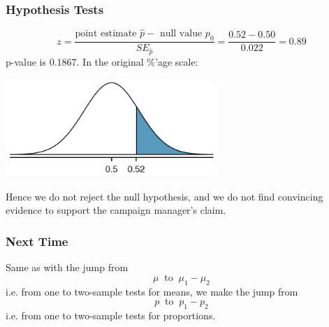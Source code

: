 \documentclass[handout]{beamer}
\newcommand{\blue}[1]{\textcolor{blue2}{#1}}
\newcommand{\phat}{\widehat{p}}
\begin{document}
\begin{frame}[fragile]
\frametitle{Hypothesis Tests}

%
%
\[
z = \frac{\mbox{point estimate }\phat - \mbox{ null value }p_0}{SE_{\phat}} = \frac{0.52 - 0.50}{0.022} = 0.89
\]
\pause p-value is 0.1867.  In the original \%'age scale:
\begin{center}
   \includegraphics[width=0.6\textwidth]{figure/pvalue.png} 
\end{center}
\pause Hence we do \blue{not} reject the null hypothesis, and we do not find convincing evidence to support the campaign manager's claim.  

\end{frame}


\begin{frame}[fragile]
\addtocounter{framenumber}{2}
\frametitle{Next Time}

Same as with the jump from 
\[\mu \ \mbox{ to } \ \mu_1-\mu_2\] 
i.e. from one to two-sample tests for means, 
we make the jump from 
\[p \ \mbox{ to } \ p_1-p_2\]
i.e. from one to two-sample tests for proportions.
\end{frame}
\end{document}
